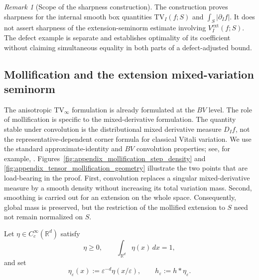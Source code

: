 \documentclass[11pt,letterpaper]{article}
\theoremstyle{definition}
\theoremstyle{remark}
\newtheorem{remark}[theorem]{Remark}
\newcommand{\TV}{\mathrm{TV}}
\begin{document}
\begin{remark}[Scope of the sharpness construction]
\label{rem:appendix_scope_sharpness_construction}
The construction proves sharpness for the internal smooth box quantities
$\TV_I(f;S)$ and $\int_S|\partial_If|$. It does not assert sharpness of the
extension-seminorm estimate involving $V_I^{\mathrm{ext}}(f;S)$. The defect
example is separate and establishes optimality of its coefficient without
claiming simultaneous equality in both parts of a defect-adjusted bound.
\end{remark}

  
\subsection{Mollification and the extension mixed-variation seminorm}
\label{subsec:appendix_mollification_extension}
  

The anisotropic $\TV_\infty$ formulation is already formulated at the $BV$ level.
The role of mollification is specific to the mixed-derivative formulation. The
quantity stable under convolution is the distributional mixed derivative
measure $D_I f$, not the representative-dependent corner formula for classical
Vitali variation. We use the standard approximate-identity and $BV$
convolution properties; see, for example, \cite{evans,AmbrosioFuscoPallara2000}. Figures~\ref{fig:appendix_mollification_step_density} and
\ref{fig:appendix_tensor_mollification_geometry} illustrate the two points that
are load-bearing in the proof. First, convolution replaces a singular
mixed-derivative measure by a smooth density without increasing its total
variation mass. Second, smoothing is carried out for an extension on the whole
space. Consequently, global mass is preserved, but the restriction of the
mollified extension to $S$ need not remain normalized on $S$.

Let $\eta\in C_c^\infty(\mathbb R^d)$ satisfy
$$
\eta\ge0,
\qquad
\int_{\mathbb R^d}\eta(x)\,dx=1,
$$
and set
$$
\eta_\varepsilon(x):=\varepsilon^{-d}\eta(x/\varepsilon),
\qquad
h_\varepsilon:=h*\eta_\varepsilon.
$$
\end{document}

